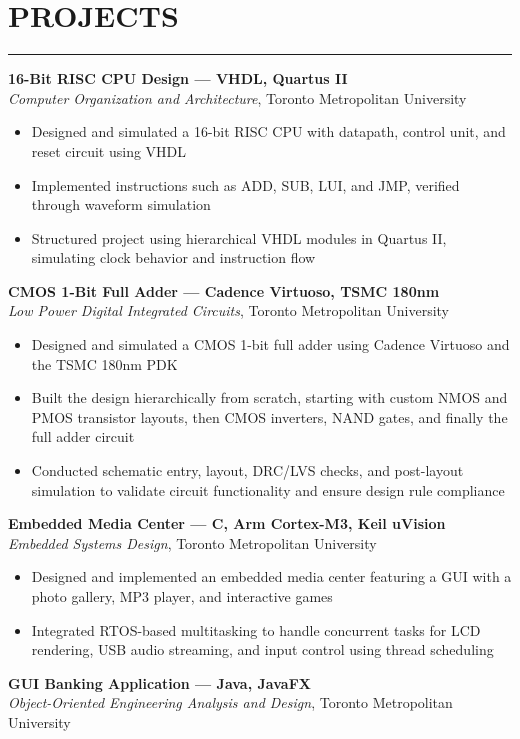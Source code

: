 \documentclass[12pt, letterpaper]{article}
\begin{document}
	\section*{PROJECTS}
		\noindent\rule{\textwidth}{0.5pt}
		\textbf{16-Bit RISC CPU Design --- VHDL, Quartus II}\\
		\textit{Computer Organization and Architecture}, Toronto Metropolitan University
		\begin{itemize}
			\item Designed and simulated a 16-bit RISC CPU with datapath, control unit, and reset circuit using VHDL
			\item Implemented instructions such as ADD, SUB, LUI, and JMP, verified through waveform simulation
			\item Structured project using hierarchical VHDL modules in Quartus II, simulating clock behavior and instruction flow
		\end{itemize}
		\textbf{CMOS 1-Bit Full Adder --- Cadence Virtuoso, TSMC 180nm}\\
		\textit{Low Power Digital Integrated Circuits}, Toronto Metropolitan University
		\begin{itemize}
			\item Designed and simulated a CMOS 1-bit full adder using Cadence Virtuoso and the TSMC 180nm PDK
			\item Built the design hierarchically from scratch, starting with custom NMOS and PMOS transistor layouts, then CMOS inverters, NAND gates, and finally the full adder circuit
			\item Conducted schematic entry, layout, DRC/LVS checks, and post-layout simulation to validate circuit functionality and ensure design rule compliance
		\end{itemize}
		\textbf{Embedded Media Center --- C, Arm Cortex-M3, Keil uVision}\\
		\textit{Embedded Systems Design}, Toronto Metropolitan University
		\begin{itemize}
			\item Designed and implemented an embedded media center featuring a GUI with a photo gallery, MP3 player, and interactive games
			\item Integrated RTOS-based multitasking to handle concurrent tasks for LCD rendering, USB audio streaming, and input control using thread scheduling
		\end{itemize}
		\textbf{GUI Banking Application --- Java, JavaFX}\\
		\textit{Object-Oriented Engineering Analysis and Design}, Toronto Metropolitan University
\end{document}
